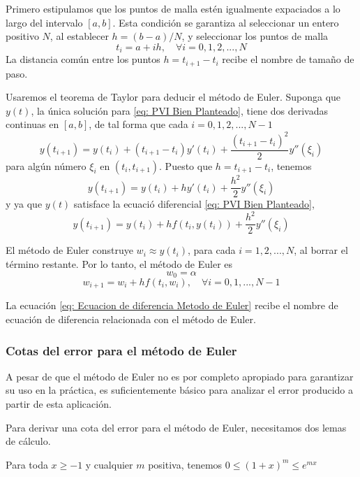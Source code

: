 Primero estipulamos que los puntos de malla estén igualmente expaciados a lo largo del intervalo $[a, b]$. Esta condición se garantiza al seleccionar un entero positivo $N$, al establecer $h = (b - a) / N$, y seleccionar los puntos de malla
\[t_i = a +  i h, \quad \forall i = 0, 1, 2, ..., N\]
La distancia común entre los puntos $h = t_{i + 1} - t_i$ recibe el nombre de tamaño de paso.

Usaremos el teorema de Taylor para deducir el método de Euler. Suponga que $y(t)$, la única solución para \ref{eq: PVI Bien Planteado}, tiene dos derivadas continuas en $[a, b]$, de tal forma que cada $i = 0, 1, 2, ..., N - 1$
\[ y (t_{i + 1}) = y(t_i) + (t_{i+1} - t_i) y'(t_i) + \frac{(t_{i + 1} - t_i)^2}{2} y''(\xi_i) \]
para algún número $\xi_i$ en $(t_i, t_{i + 1})$. Puesto que $h = t_{i + 1} - t_i$, tenemos
\[ y(t_{i + 1}) = y(t_i) + h y'(t_i) + \frac{h^2}{2} y''(\xi_i)\]
y ya que $y(t)$ satisface la ecuació diferencial \ref{eq: PVI Bien Planteado},
\begin{equation}
    y(t_{i + 1}) = y(t_i) + h f(t_i, y(t_i)) + \frac{h^2}{2} y''(\xi_i)
\end{equation}

El método de Euler construye $w_i \approx y(t_i)$, para cada $i = 1, 2, ..., N$, al borrar el término restante. Por lo tanto, el método de Euler es
\[ w_0 = \alpha \]
\begin{equation}
    \label{eq: Ecuacion de diferencia Metodo de Euler}
    w_{i + 1} = w_i + h f(t_i, w_i), \quad \forall i = 0, 1, ..., N - 1
\end{equation}

La ecuación \ref{eq: Ecuacion de diferencia Metodo de Euler} recibe el nombre de ecuación de diferencia relacionada con el método de Euler.

\subsubsection{Cotas del error para el método de Euler}
A pesar de que el método de Euler no es por completo apropiado para garantizar su uso en la práctica, es suficientemente básico para analizar el error producido a partir de esta aplicación.

Para derivar una cota del error para el método de Euler, necesitamos dos lemas de cálculo.

\begin{lemma}
    Para toda $x \geq -1$ y cualquier $m$ positiva, tenemos $ 0 \leq (1 + x)^m \leq e^{mx} $
\end{lemma}

